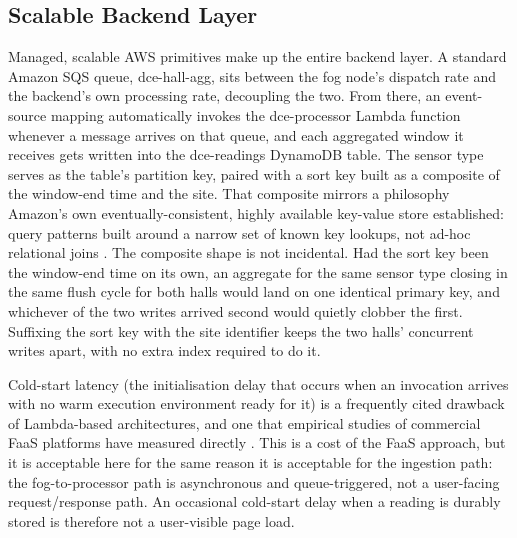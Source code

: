\documentclass[conference]{IEEEtran}
\begin{document}
\subsection{Scalable Backend Layer}
Managed, scalable AWS primitives make up the entire backend layer. A standard Amazon SQS queue, dce-hall-agg, sits between the fog node's dispatch rate and the backend's own processing rate, decoupling the two. From there, an event-source mapping automatically invokes the dce-processor Lambda function whenever a message arrives on that queue, and each aggregated window it receives gets written into the dce-readings DynamoDB table. The sensor type serves as the table's partition key, paired with a sort key built as a composite of the window-end time and the site. That composite mirrors a philosophy Amazon's own eventually-consistent, highly available key-value store established: query patterns built around a narrow set of known key lookups, not ad-hoc relational joins \cite{ref9}. The composite shape is not incidental. Had the sort key been the window-end time on its own, an aggregate for the same sensor type closing in the same flush cycle for both halls would land on one identical primary key, and whichever of the two writes arrived second would quietly clobber the first. Suffixing the sort key with the site identifier keeps the two halls' concurrent writes apart, with no extra index required to do it.

Cold-start latency (the initialisation delay that occurs when an invocation arrives with no warm execution environment ready for it) is a frequently cited drawback of Lambda-based architectures, and one that empirical studies of commercial FaaS platforms have measured directly \cite{ref10}. This is a cost of the FaaS approach, but it is acceptable here for the same reason it is acceptable for the ingestion path: the fog-to-processor path is asynchronous and queue-triggered, not a user-facing request/response path. An occasional cold-start delay when a reading is durably stored is therefore not a user-visible page load.
\end{document}
